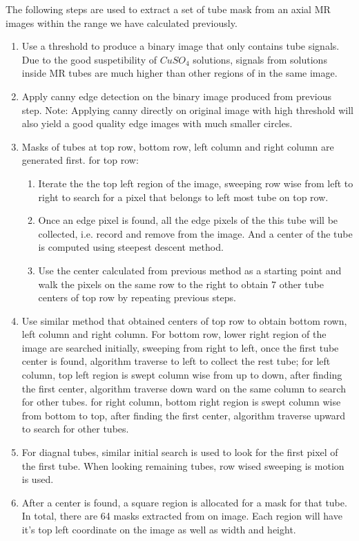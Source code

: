 The following steps are used to extract a set of tube mask from an axial MR images within the range we have
calculated previously.
\begin{enumerate}
\item Use a threshold to produce a binary image that only contains tube signals. 
  Due to the good suspetibility of $CuSO_4$ solutions, signals from solutions inside MR tubes are much
  higher than other regions of in the same image.
\item Apply canny edge detection on the binary image produced from previous step. Note: Applying canny
  directly on original image with high threshold will also yield a good quality edge images with much
  smaller circles.
\item Masks of tubes at top row, bottom row, left column  and right column are generated first. 
  for top row:
  \begin{enumerate}
  \item Iterate the the top left region of the image, sweeping row wise from left to right to search 
    for a pixel that belongs to left most tube on top row.
  \item Once an edge pixel is found, all the edge pixels of the this tube will be collected, i.e. record and 
    remove from the image. And a center of the tube is computed using steepest descent method. 
  \item Use the center calculated from previous method as a starting point and walk the pixels on the same row
    to the right to obtain 7 other tube centers of top row by repeating previous steps.
  \end{enumerate}
\item Use similar method that obtained centers of top row to obtain bottom rown, left column and right column. 
  For bottom row, lower right region of the image are searched initially, sweeping from right to left, once
  the first tube center is found, algorithm traverse to left to collect the rest tube; 
  for left column, top left region is swept column wise from up to down, after finding the first center, 
  algorithm traverse down ward on the same column to search for other tubes.
  for right column, bottom right region is swept column wise from bottom to top, after finding the first
  center, algorithm traverse upward to search for other tubes.
\item For diagnal tubes, similar initial search is used to look for the first pixel of the first tube. 
  When looking remaining tubes, row wised sweeping is motion is used. 
\item After a center is found, a square region is allocated for a mask for that tube. In total, there are 64
  masks extracted from on image. Each region will have it's top left coordinate on the image as well as 
  width and height.
\end{enumerate}

